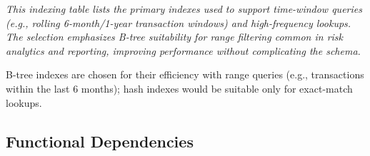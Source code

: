 \documentclass[12pt,a4paper]{report}
\begin{document}
\vspace{2pt}
\noindent\textit{\small This indexing table lists the primary indexes used to support time-window queries (e.g., rolling 6-month/1-year transaction windows) and high-frequency lookups. The selection emphasizes B-tree suitability for range filtering common in risk analytics and reporting, improving performance without complicating the schema.}

B-tree indexes are chosen for their efficiency with range queries (e.g., transactions within the last 6 months); hash indexes would be suitable only for exact-match lookups.

\subsection{Functional Dependencies}
\end{document}
